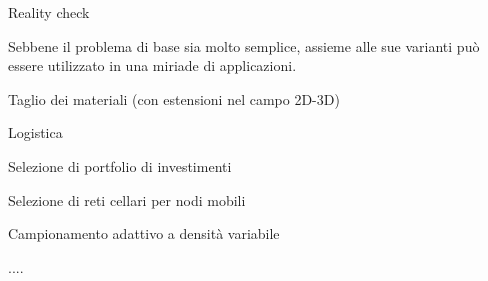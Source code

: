 \begin{frame}{Reality check}

Sebbene il problema di base sia molto semplice, assieme alle sue varianti può essere utilizzato in una miriade di applicazioni.

\BIL
\item Taglio dei materiali (con estensioni nel campo 2D-3D)
\item Logistica
\item Selezione di portfolio di investimenti
\item Selezione di reti cellari per nodi mobili
\item Campionamento adattivo a densità variabile
\item ....
\EIL

\end{frame}





